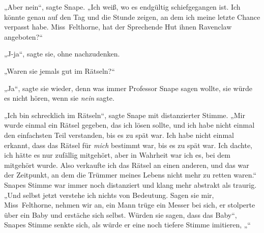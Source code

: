 „Aber nein“, sagte Snape.
„Ich weiß, wo es endgültig schiefgegangen ist. Ich könnte genau auf den Tag und die Stunde zeigen, an dem ich meine letzte Chance verpasst habe. Miss~Felthorne, hat der Sprechende Hut ihnen Ravenclaw angeboten?“

„J-ja“, sagte sie, ohne nachzudenken.

„Waren sie jemals gut im Rätseln?“

„Ja“, sagte sie wieder, denn was immer Professor Snape sagen wollte, sie würde es nicht hören, wenn sie \emph{nein} sagte.

„Ich bin schrecklich im Rätseln“, sagte Snape mit distanzierter Stimme.
„Mir wurde einmal ein Rätsel gegeben, das ich lösen sollte, und ich habe nicht einmal den einfachsten Teil verstanden, bis es zu spät war. Ich habe nicht einmal erkannt, dass das Rätsel für \emph{mich} bestimmt war, bis es zu spät war. Ich dachte, ich hätte es nur zufällig mitgehört, aber in Wahrheit war ich es, bei dem mitgehört wurde. Also verkaufte ich das Rätsel an einen anderen, und das war der Zeitpunkt, an dem die Trümmer meines Lebens nicht mehr zu retten waren.“ Snapes Stimme war immer noch distanziert und klang mehr abstrakt als traurig.
„Und selbst jetzt verstehe ich nichts von Bedeutung. Sagen sie mir, Miss~Felthorne, nehmen wir an, ein Mann trüge ein Messer bei sich, er stolperte über ein Baby und erstäche sich selbst. Würden sie sagen, dass das Baby“, Snapes Stimme senkte sich, als würde er eine noch tiefere Stimme imitieren, „“


